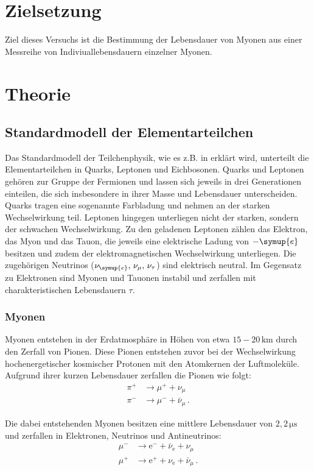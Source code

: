 \section{Zielsetzung}
\label{sec:Zielsetzung}
Ziel dieses Versuchs ist die Bestimmung der Lebensdauer von Myonen aus einer Messreihe von Indiviuallebensdauern einzelner Myonen.
\section{Theorie}
\label{sec:Theorie}
\subsection{Standardmodell der Elementarteilchen}
Das Standardmodell der Teilchenphysik, wie es z.B. in \cite{Astroteilchenphysik} erklärt wird, unterteilt die Elementarteilchen in Quarks, Leptonen und Eichbosonen.
Quarks und Leptonen gehören zur Gruppe der Fermionen und lassen sich jeweils in drei Generationen einteilen, 
die sich insbesondere in ihrer Masse und Lebensdauer unterscheiden.\\
Quarks tragen eine sogenannte Farbladung und nehmen an der starken Wechselwirkung teil. 
Leptonen hingegen unterliegen nicht der starken, sondern der schwachen Wechselwirkung. 
Zu den geladenen Leptonen zählen das Elektron, das Myon und das Tauon, die jeweils eine elektrische Ladung von $-\symup{e}$ besitzen und zudem der elektromagnetischen Wechselwirkung 
unterliegen. 
Die zugehörigen Neutrinos ($\nu_{\symup{e}},\, \nu_\mu,\, \nu_\tau$) sind elektrisch neutral. Im Gegensatz zu Elektronen sind Myonen und Tauonen instabil und zerfallen mit charakteristischen Lebensdauern $\tau$.

\subsubsection{Myonen}
\label{sec:Myonen}
Myonen entstehen in der Erdatmosphäre in Höhen von etwa $15{-}20\,\unit{\kilo\meter}$ durch den Zerfall von Pionen. 
Diese Pionen entstehen zuvor bei der Wechselwirkung hochenergetischer kosmischer Protonen mit den Atomkernen der Luftmoleküle. 
Aufgrund ihrer kurzen Lebensdauer zerfallen die Pionen wie folgt:
\begin{align*}
	\pi^+ &\rightarrow \mu^+ + \nu_\mu \\
	\pi^- &\rightarrow \mu^- + \bar{\nu}_\mu\,.
\end{align*}

Die dabei entstehenden Myonen besitzen eine mittlere Lebensdauer von $2,2\,\unit{\micro\second}$ und zerfallen in Elektronen, Neutrinos und Antineutrinos:
\begin{align*}
	\mu^- &\rightarrow \text{e}^- + \bar{\nu}_\text{e} + \nu_\mu \\
	\mu^+ &\rightarrow \text{e}^+ + \nu_\text{e} + \bar{\nu}_\mu\,.
\end{align*}

